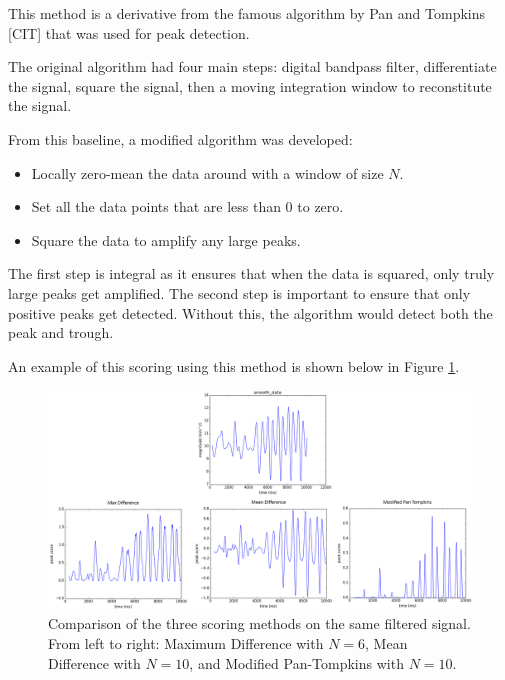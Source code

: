                 This method is a derivative from the famous algorithm by Pan and Tompkins [CIT] that was used for peak detection. 

                The original algorithm had four main steps: digital bandpass filter, differentiate the signal, square the signal, then a moving integration window to reconstitute the signal.

                From this baseline, a modified algorithm was developed:

                \begin{itemize}
                    \item Locally zero-mean the data around with a window of size $N$.
                    \item Set all the data points that are less than 0 to zero.
                    \item Square the data to amplify any large peaks.
                \end{itemize}

                The first step is integral as it ensures that when the data is squared, only truly large peaks get amplified. The second step is important to ensure that only positive peaks get detected. Without this, the algorithm would detect both the peak and trough.

                An example of this scoring using this method is shown below in Figure \ref{img_compare_scoring}.

                \begin{figure}[!th]
                    \includegraphics[width=\textwidth]{Images/compare_scoring.png}
                    \centering
                    \caption{Comparison of the three scoring methods on the same filtered signal. From left to right: Maximum Difference with $N=6$, Mean Difference with $N=10$, and Modified Pan-Tompkins with $N=10$.}
                    \label{img_compare_scoring}
                \end{figure}


